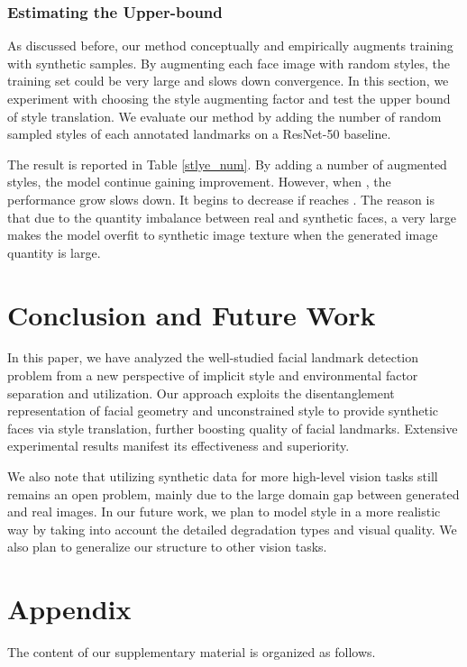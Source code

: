 \documentclass[10pt,twocolumn,letterpaper]{article}
\begin{document}
\subsubsection{Estimating the Upper-bound}
As discussed before, our method conceptually and empirically augments training with  synthetic samples. By augmenting each face image with  random styles, the training set could be very large and slows down convergence. In this section, we experiment with choosing the style augmenting factor  and test the upper bound of style translation. We evaluate our method by adding the number of random sampled styles  of each annotated landmarks on a ResNet-50 baseline. 

The result is reported in Table \ref{stlye_num}. By adding a number of augmented styles, the model continue gaining improvement. However, when , the performance grow slows down. It begins to decrease if  reaches . The reason is that due to the quantity imbalance between real and synthetic faces, a very large  makes the model overfit to synthetic image texture when the generated image quantity is large.


\section{Conclusion and Future Work}

In this paper, we have analyzed the well-studied facial landmark detection problem from a new perspective of implicit style and environmental factor separation and utilization. Our approach exploits the disentanglement representation of facial geometry and unconstrained style to provide synthetic faces via style translation, further boosting quality of facial landmarks. Extensive experimental results manifest its effectiveness and superiority. 

We also note that utilizing synthetic data for more high-level vision tasks still remains an open problem, mainly due to the large domain gap between generated and real images. In our future work, we plan to model style in a more realistic way by taking into account the detailed degradation types and visual quality. We also plan to generalize our structure to other vision tasks.

{\small


}

\clearpage
\section*{Appendix}
The content of our supplementary material is organized as follows.
\end{document}
